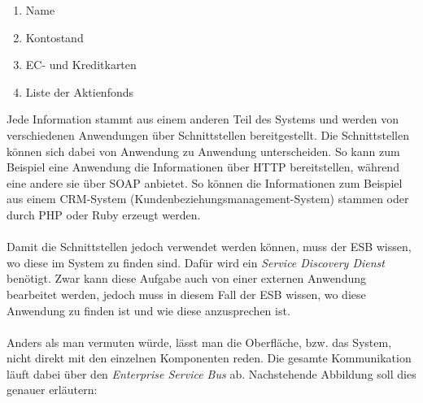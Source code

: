 \begin{enumerate}
    \item Name
    \item Kontostand
    \item EC- und Kreditkarten
    \item Liste der Aktienfonds
\end{enumerate}

Jede Information stammt aus einem anderen Teil des Systems und werden von verschiedenen Anwendungen über Schnittstellen bereitgestellt. Die Schnittstellen können sich dabei von Anwendung zu Anwendung unterscheiden. So kann zum Beispiel eine Anwendung die Informationen über HTTP bereitstellen, während eine andere sie über SOAP anbietet. So können die Informationen zum Beispiel aus einem CRM-System (Kundenbeziehungsmanagement-System) stammen oder durch PHP oder Ruby erzeugt werden. 
\\\\
Damit die Schnittstellen jedoch verwendet werden können, muss der ESB wissen, wo diese im System zu finden sind. Dafür wird ein \textit{Service Discovery Dienst} benötigt. Zwar kann diese Aufgabe auch von einer externen Anwendung bearbeitet werden, jedoch muss in diesem Fall der ESB wissen, wo diese Anwendung zu finden ist und wie diese anzusprechen ist.
\\\\
Anders als man vermuten würde, lässt man die Oberfläche, bzw. das System, nicht direkt mit den einzelnen Komponenten reden. Die gesamte Kommunikation läuft dabei über den \textit{Enterprise Service Bus} ab. Nachstehende Abbildung soll dies genauer erläutern:

